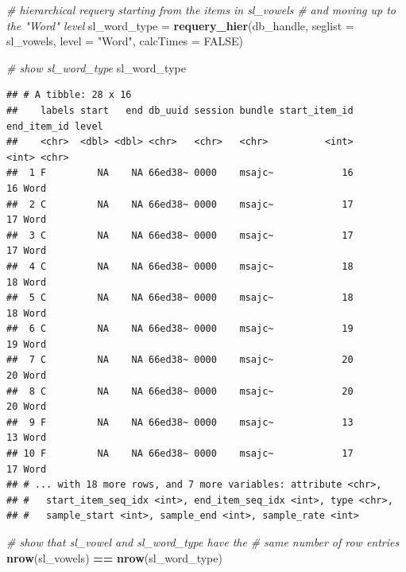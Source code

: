 \documentclass[]{book}
\newenvironment{Shaded}{\begin{snugshade}}{\end{snugshade}}
\newcommand{\CommentTok}[1]{\textcolor[rgb]{0.56,0.35,0.01}{\textit{#1}}}
\newcommand{\DataTypeTok}[1]{\textcolor[rgb]{0.13,0.29,0.53}{#1}}
\newcommand{\KeywordTok}[1]{\textcolor[rgb]{0.13,0.29,0.53}{\textbf{#1}}}
\newcommand{\NormalTok}[1]{#1}
\newcommand{\OperatorTok}[1]{\textcolor[rgb]{0.81,0.36,0.00}{\textbf{#1}}}
\newcommand{\OtherTok}[1]{\textcolor[rgb]{0.56,0.35,0.01}{#1}}
\newcommand{\StringTok}[1]{\textcolor[rgb]{0.31,0.60,0.02}{#1}}
\begin{document}
\begin{Shaded}
\begin{Highlighting}[]
\CommentTok{# hierarchical requery starting from the items in sl_vowels}
\CommentTok{# and moving up to the "Word" level}
\NormalTok{sl_word_type =}\StringTok{ }\KeywordTok{requery_hier}\NormalTok{(db_handle,}
                           \DataTypeTok{seglist =}\NormalTok{ sl_vowels,}
                           \DataTypeTok{level =} \StringTok{"Word"}\NormalTok{,}
                           \DataTypeTok{calcTimes =} \OtherTok{FALSE}\NormalTok{)}

\CommentTok{# show sl_word_type}
\NormalTok{sl_word_type}
\end{Highlighting}
\end{Shaded}

\begin{verbatim}
## # A tibble: 28 x 16
##    labels start   end db_uuid session bundle start_item_id end_item_id level
##    <chr>  <dbl> <dbl> <chr>   <chr>   <chr>          <int>       <int> <chr>
##  1 F         NA    NA 66ed38~ 0000    msajc~            16          16 Word 
##  2 C         NA    NA 66ed38~ 0000    msajc~            17          17 Word 
##  3 C         NA    NA 66ed38~ 0000    msajc~            17          17 Word 
##  4 C         NA    NA 66ed38~ 0000    msajc~            18          18 Word 
##  5 C         NA    NA 66ed38~ 0000    msajc~            18          18 Word 
##  6 C         NA    NA 66ed38~ 0000    msajc~            19          19 Word 
##  7 C         NA    NA 66ed38~ 0000    msajc~            20          20 Word 
##  8 C         NA    NA 66ed38~ 0000    msajc~            20          20 Word 
##  9 F         NA    NA 66ed38~ 0000    msajc~            13          13 Word 
## 10 F         NA    NA 66ed38~ 0000    msajc~            17          17 Word 
## # ... with 18 more rows, and 7 more variables: attribute <chr>,
## #   start_item_seq_idx <int>, end_item_seq_idx <int>, type <chr>,
## #   sample_start <int>, sample_end <int>, sample_rate <int>
\end{verbatim}

\begin{Shaded}
\begin{Highlighting}[]
\CommentTok{# show that sl_vowel and sl_word_type have the}
\CommentTok{# same number of row entries}
\KeywordTok{nrow}\NormalTok{(sl_vowels) }\OperatorTok{==}\StringTok{ }\KeywordTok{nrow}\NormalTok{(sl_word_type)}
\end{Highlighting}
\end{Shaded}
\end{document}

